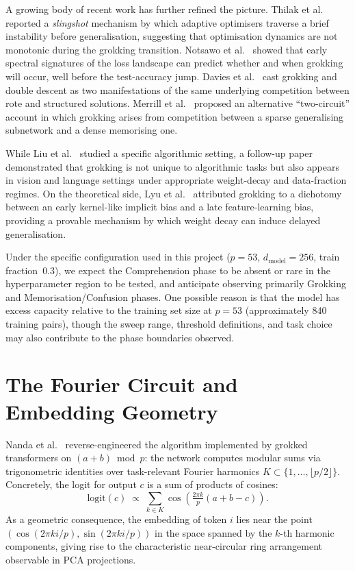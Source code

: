 \documentclass[12pt,openany,a4paper]{book}
\begin{document}
A growing body of recent work has further refined the picture.
Thilak et al.\ \cite{thilak2022slingshot} reported a
\emph{slingshot} mechanism by which adaptive optimisers traverse a
brief instability before generalisation, suggesting that
optimisation dynamics are not monotonic during the grokking
transition.
Notsawo et al.\ \cite{notsawo2023predicting} showed that early
spectral signatures of the loss landscape can predict whether and
when grokking will occur, well before the test-accuracy jump.
Davies et al.\ \cite{davies2023unifying} cast grokking and double
descent as two manifestations of the same underlying competition
between rote and structured solutions.
Merrill et al.\ \cite{merrill2023tale} proposed an alternative
``two-circuit'' account in which grokking arises from competition
between a sparse generalising subnetwork and a dense memorising
one.

While Liu et al.\ \cite{liu2022towards} studied a specific
algorithmic setting, a follow-up paper \cite{liu2023omnigrok}
demonstrated that grokking is not unique to algorithmic tasks but
also appears in vision and language settings under appropriate
weight-decay and data-fraction regimes.
On the theoretical side, Lyu et al.\ \cite{lyu2024dichotomy}
attributed grokking to a dichotomy between an early kernel-like
implicit bias and a late feature-learning bias, providing a
provable mechanism by which weight decay can induce delayed
generalisation.

Under the specific configuration used in this project ($p=53$,
$d_{\mathrm{model}}=256$, train fraction~$0.3$), we expect
the Comprehension phase to be absent or rare in the hyperparameter
region to be tested, and anticipate observing primarily Grokking
and Memorisation/Confusion phases.
One possible reason is that the model has excess capacity relative
to the training set size at $p=53$ (approximately 840 training
pairs), though the sweep range, threshold definitions, and task
choice may also contribute to the phase boundaries observed.

\section{The Fourier Circuit and Embedding Geometry}

Nanda et al.\ \cite{nanda2023progress} reverse-engineered the
algorithm implemented by grokked transformers on $(a+b)\bmod p$:
the network computes modular sums via trigonometric identities
over task-relevant Fourier harmonics $K\subset\{1,\dots,\lfloor
p/2\rfloor\}$.
Concretely, the logit for output $c$ is a sum of products of cosines:
\[
  \mathrm{logit}(c) \;\propto\; \sum_{k\in K}
    \cos\!\left(\tfrac{2\pi k}{p}(a+b-c)\right).
\]
As a geometric consequence, the embedding of token $i$ lies near
the point $(\cos(2\pi ki/p),\sin(2\pi ki/p))$ in the space spanned
by the $k$-th harmonic components, giving rise to the characteristic
near-circular ring arrangement observable in PCA projections.
\end{document}
